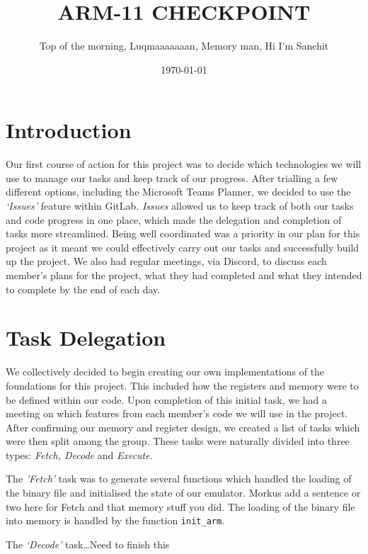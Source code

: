 \documentclass[11pt]{article}
\begin{document}
\title{ARM-11 CHECKPOINT}

\author{Top of the morning, Luqmaaaaaaan, Memory man, Hi I'm Sanchit}

\date{\today}

\maketitle

\section*{Introduction}
Our first course of action for this project was to decide which technologies we will use to manage our tasks
and keep track of our progress. After trialling a few different options, including the Microsoft Teams Planner,
we decided to use the \textsl{‘Issues’} feature within GitLab. \textsl{Issues} allowed us to keep track of both our tasks and code
progress in one place, which made the delegation and completion of tasks more streamlined. Being well coordinated was a priority in our plan for this project as it meant we could effectively carry out our tasks and
successfully build up the project. We also had regular meetings, via Discord, to discuss each member’s plans
for the project, what they had completed and what they intended to complete by the end of each day. 


\section*{Task Delegation}
We collectively decided to begin creating our own implementations of the foundations for this project. This
included how the registers and memory were to be defined within our code. Upon completion of this initial
task, we had a meeting on which features from each member’s code we will use in the project. After
confirming our memory and register design, we created a list of tasks which were then split among the group.
These tasks were naturally divided into three types: \textsl{Fetch, Decode} and \textsl{Execute}.


The \textsl{'Fetch'} task was to generate several functions which handled the loading of the binary file and initialised
the state of our emulator. 
Morkus add a sentence or two here for Fetch and that memory stuff you did. 
The loading of the binary file into memory is handled by the function {\tt init\_arm}.


The \textsl{‘Decode’} task…Need to finish this
\end{document}
